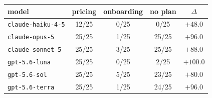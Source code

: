 \begin{tabular}{lcccc}
\toprule
model & pricing & onboarding & no plan & $\Delta$ \\
\midrule
\texttt{claude-haiku-4-5} & 12/25 & 0/25 & 0/25 & $+48.0$ \\
\texttt{claude-opus-5} & 25/25 & 1/25 & 25/25 & $+96.0$ \\
\texttt{claude-sonnet-5} & 25/25 & 3/25 & 25/25 & $+88.0$ \\
\texttt{gpt-5.6-luna} & 25/25 & 0/25 & 2/25 & $+100.0$ \\
\texttt{gpt-5.6-sol} & 25/25 & 5/25 & 23/25 & $+80.0$ \\
\texttt{gpt-5.6-terra} & 25/25 & 1/25 & 24/25 & $+96.0$ \\
\bottomrule
\end{tabular}
